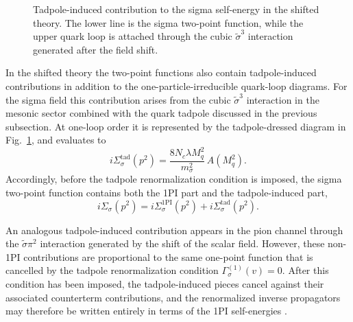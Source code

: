 \begin{figure}[htbp]
\centering
{}
\caption{Tadpole-induced contribution to the sigma self-energy in the shifted theory. The lower line is the sigma two-point function, while the upper quark loop is attached through the cubic \(\tilde{\sigma}^3\) interaction generated after the field shift.}
\label{fig:qm_sigma_tadpole_selfenergy}
\end{figure}

In the shifted theory the two-point functions also contain
tadpole-induced contributions in addition to the one-particle-irreducible
quark-loop diagrams. For the sigma field this contribution arises from
the cubic \(\tilde{\sigma}^3\) interaction in the mesonic sector
combined with the quark tadpole discussed in the previous subsection.
At one-loop order it is represented by the tadpole-dressed diagram in
Fig.~\ref{fig:qm_sigma_tadpole_selfenergy}, and evaluates to
\begin{equation}
i\Sigma_{\sigma}^{\mathrm{tad}}(p^2)
=
\frac{8N_c\lambda M_q^2}{m_\sigma^2}\,A(M_q^2).
\label{eq:qm_sigma_tadpole_part}
\end{equation}
Accordingly, before the tadpole renormalization condition is imposed,
the sigma two-point function contains both the 1PI part and the
tadpole-induced part,
\begin{equation}
i\Sigma_\sigma(p^2)
=
i\Sigma_{\sigma}^{\mathrm{1PI}}(p^2)
+
i\Sigma_{\sigma}^{\mathrm{tad}}(p^2).
\label{eq:qm_sigma_full_before_ct}
\end{equation}

An analogous tadpole-induced contribution appears in the pion channel
through the \(\tilde{\sigma}\pi^2\) interaction generated by the shift
of the scalar field. However, these non-1PI contributions are
proportional to the same one-point function that is cancelled by the
tadpole renormalization condition \(\Gamma_\sigma^{(1)}(v)=0\). After
this condition has been imposed, the tadpole-induced pieces cancel
against their associated counterterm contributions, and the
renormalized inverse propagators may therefore be written entirely in
terms of the 1PI self-energies \cite{Folkestad2018,Andersen2024}.

